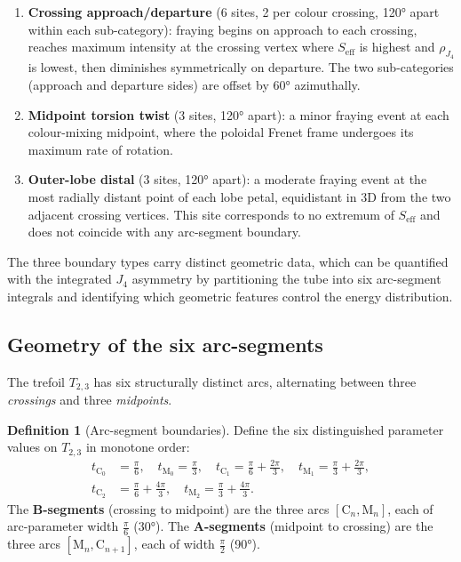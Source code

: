 \documentclass[11pt,a4paper]{article}
\theoremstyle{definition}\newtheorem{definition}[theorem]{Definition}
\theoremstyle{remark}
\theoremstyle{definition}\newtheorem{construction}[theorem]{Construction}
\begin{document}
\begin{enumerate}[label=(\roman*)]
\item \textbf{Crossing approach/departure} (6 sites, 2 per colour crossing,
  120° apart within each sub-category): fraying begins on approach to
  each crossing, reaches maximum intensity at the crossing vertex where
  $S_{\mathrm{eff}}$ is highest and $\rho_{J_4}$ is lowest, then
  diminishes symmetrically on departure.  The two sub-categories
  (approach and departure sides) are offset by 60° azimuthally.
\item \textbf{Midpoint torsion twist} (3 sites, 120° apart): a minor
  fraying event at each colour-mixing midpoint, where the poloidal
  Frenet frame undergoes its maximum rate of rotation.
\item \textbf{Outer-lobe distal} (3 sites, 120° apart): a moderate
  fraying event at the most radially distant point of each lobe petal,
  equidistant in 3D from the two adjacent crossing vertices.  This site
  corresponds to no extremum of $S_{\mathrm{eff}}$ and does not coincide
  with any arc-segment boundary.
\end{enumerate}

The three boundary types carry distinct geometric data, which can be
quantified with the integrated $J_4$ asymmetry by partitioning the tube
into six arc-segment integrals and identifying which geometric features
control the energy distribution.

\subsection{Geometry of the six arc-segments}
\label{P16:sec:arcseg_geometry}

The trefoil $T_{2,3}$ has six structurally distinct arcs, alternating
between three \emph{crossings} and three \emph{midpoints}.

\begin{definition}[Arc-segment boundaries]
\label{P16:def:arc_boundaries}
Define the six distinguished parameter values on $T_{2,3}$ in
monotone order:
\begin{align}
  t_{\mathrm{C}_0} &= \tfrac{\pi}{6},\quad
  t_{\mathrm{M}_0} = \tfrac{\pi}{3},\quad
  t_{\mathrm{C}_1} = \tfrac{\pi}{6}+\tfrac{2\pi}{3},\quad
  t_{\mathrm{M}_1} = \tfrac{\pi}{3}+\tfrac{2\pi}{3},\nonumber\\
  t_{\mathrm{C}_2} &= \tfrac{\pi}{6}+\tfrac{4\pi}{3},\quad
  t_{\mathrm{M}_2} = \tfrac{\pi}{3}+\tfrac{4\pi}{3}.
\end{align}
The \textbf{B-segments} (crossing to midpoint) are the three arcs
$[\mathrm{C}_n, \mathrm{M}_n]$, each of arc-parameter width
$\tfrac{\pi}{6}$ (30°).  The \textbf{A-segments} (midpoint to
crossing) are the three arcs $[\mathrm{M}_n, \mathrm{C}_{n+1}]$,
each of width $\tfrac{\pi}{2}$ (90°).
\end{definition}
\end{document}
